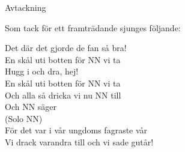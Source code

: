 \begin{flushleft}
{\Huge Avtackning\\}
\end{flushleft}
{\large
Som tack för ett framträdande sjunges följande:

\begin{flushleft}
Det där det gjorde de fan så bra!\\
En skål uti botten för NN vi ta\\
\repopen Hugg i och dra, hej! \repclose\\
En skål uti botten för NN vi ta\\
Och alla så dricka vi nu NN till\\
Och NN säger\\
(Solo NN)\\
För det var i vår ungdoms fagraste vår\\
Vi drack varandra till och vi sade gutår!\\
\end{flushleft}
}
